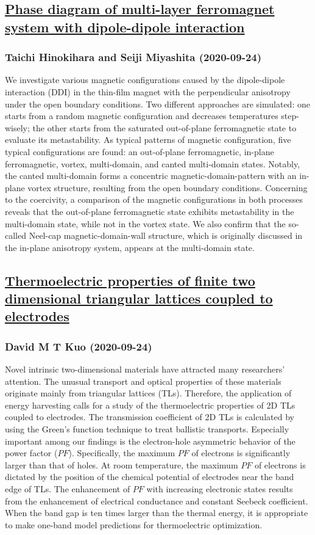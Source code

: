 \subsection*{\href{http://arxiv.org/abs/2009.11574v1}{Phase diagram of multi-layer ferromagnet system with dipole-dipole  interaction}}
\subsubsection*{Taichi Hinokihara and Seiji Miyashita (2020-09-24)}
We investigate various magnetic configurations caused by the dipole-dipole
interaction (DDI) in the thin-film magnet with the perpendicular anisotropy
under the open boundary conditions. Two different approaches are simulated: one
starts from a random magnetic configuration and decreases temperatures
step-wisely; the other starts from the saturated out-of-plane ferromagnetic
state to evaluate its metastability. As typical patterns of magnetic
configuration, five typical configurations are found: an out-of-plane
ferromagnetic, in-plane ferromagnetic, vortex, multi-domain, and canted
multi-domain states. Notably, the canted multi-domain forms a concentric
magnetic-domain-pattern with an in-plane vortex structure, resulting from the
open boundary conditions. Concerning to the coercivity, a comparison of the
magnetic configurations in both processes reveals that the out-of-plane
ferromagnetic state exhibits metastability in the multi-domain state, while not
in the vortex state. We also confirm that the so-called Neel-cap
magnetic-domain-wall structure, which is originally discussed in the in-plane
anisotropy system, appears at the multi-domain state.

\subsection*{\href{http://arxiv.org/abs/2009.11573v1}{Thermoelectric properties of finite two dimensional triangular lattices  coupled to electrodes}}
\subsubsection*{David M T Kuo (2020-09-24)}
Novel intrinsic two-dimensional materials have attracted many researchers'
attention. The unusual transport and optical properties of these materials
originate mainly from triangular lattices (TLs). Therefore, the application of
energy harvesting calls for a study of the thermoelectric properties of 2D TLs
coupled to electrodes. The transmission coefficient of 2D TLs is calculated by
using the Green's function technique to treat ballistic transports. Especially
important among our findings is the electron-hole asymmetric behavior of the
power factor ($PF$). Specifically, the maximum $PF$ of electrons is
significantly larger than that of holes. At room temperature, the maximum $PF$
of electrons is dictated by the position of the chemical potential of
electrodes near the band edge of TLs. The enhancement of $PF$ with increasing
electronic states results from the enhancement of electrical conductance and
constant Seebeck coefficient. When the band gap is ten times larger than the
thermal energy, it is appropriate to make one-band model predictions for
thermoelectric optimization.

